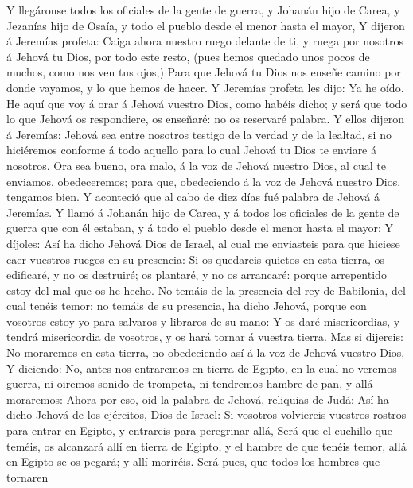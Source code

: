  Y llegáronse todos los oficiales de la gente de guerra, y
Johanán hijo de Carea, y Jezanías hijo de Osaía, y todo el pueblo desde
el menor hasta el mayor,  Y dijeron á Jeremías profeta:
Caiga ahora nuestro ruego delante de ti, y ruega por nosotros á Jehová
tu Dios, por todo este resto, (pues hemos quedado unos pocos de muchos,
como nos ven tus ojos,)  Para que Jehová tu Dios nos enseñe
camino por donde vayamos, y lo que hemos de hacer.  Y
Jeremías profeta les dijo: Ya he oído. He aquí que voy á orar á Jehová
vuestro Dios, como habéis dicho; y será que todo lo que Jehová os
respondiere, os enseñaré: no os reservaré palabra.  Y ellos
dijeron á Jeremías: Jehová sea entre nosotros testigo de la verdad y de
la lealtad, si no hiciéremos conforme á todo aquello para lo cual Jehová
tu Dios te enviare á nosotros.  Ora sea bueno, ora malo, á
la voz de Jehová nuestro Dios, al cual te enviamos, obedeceremos; para
que, obedeciendo á la voz de Jehová nuestro Dios, tengamos bien.
 Y aconteció que al cabo de diez días fué palabra de Jehová
á Jeremías.  Y llamó á Johanán hijo de Carea, y á todos los
oficiales de la gente de guerra que con él estaban, y á todo el pueblo
desde el menor hasta el mayor;  Y díjoles: Así ha dicho
Jehová Dios de Israel, al cual me enviasteis para que hiciese caer
vuestros ruegos en su presencia:  Si os quedareis quietos
en esta tierra, os edificaré, y no os destruiré; os plantaré, y no os
arrancaré: porque arrepentido estoy del mal que os he hecho.
 No temáis de la presencia del rey de Babilonia, del cual
tenéis temor; no temáis de su presencia, ha dicho Jehová, porque con
vosotros estoy yo para salvaros y libraros de su mano:  Y
os daré misericordias, y tendrá misericordia de vosotros, y os hará
tornar á vuestra tierra.  Mas si dijereis: No moraremos en
esta tierra, no obedeciendo así á la voz de Jehová vuestro Dios,
 Y diciendo: No, antes nos entraremos en tierra de Egipto,
en la cual no veremos guerra, ni oiremos sonido de trompeta, ni
tendremos hambre de pan, y allá moraremos:  Ahora por eso,
oid la palabra de Jehová, reliquias de Judá: Así ha dicho Jehová de los
ejércitos, Dios de Israel: Si vosotros volviereis vuestros rostros para
entrar en Egipto, y entrareis para peregrinar allá,  Será
que el cuchillo que teméis, os alcanzará allí en tierra de Egipto, y el
hambre de que tenéis temor, allá en Egipto se os pegará; y allí
moriréis.  Será pues, que todos los hombres que tornaren

